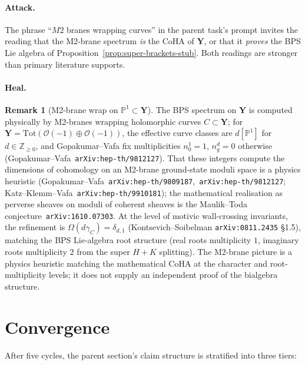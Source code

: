 \documentclass[11pt]{amsart}
\theoremstyle{definition}
\newtheorem{remark}[theorem]{Remark}
\providecommand{\CoHA}{\mathrm{CoHA}}
\providecommand{\bY}{\mathbf{Y}}
\providecommand{\cO}{\mathcal{O}}
\providecommand{\bZ}{\mathbb{Z}}
\providecommand{\bP}{\mathbb{P}}
\begin{document}
\paragraph*{Attack.}
The phrase ``$M$2 branes wrapping curves'' in the parent task's
prompt invites the reading that the M2-brane spectrum \emph{is} the
$\CoHA$ of $\bY$, or that it \emph{proves} the BPS Lie algebra of
Proposition~\ref{prop:super-brackets-stub}. Both readings are
stronger than primary literature supports.

\paragraph*{Heal.}

\begin{remark}[M2-brane wrap on $\bP^1 \subset \bY$]
\label{rem:m2-wrap-status}
The BPS spectrum on $\bY$ is computed physically by M2-branes
wrapping holomorphic curves $C \subset \bY$; for $\bY =
\mathrm{Tot}(\cO(-1) \oplus \cO(-1))$, the effective curve classes
are $d[\bP^1]$ for $d \in \bZ_{\geq 0}$, and Gopakumar--Vafa fix
multiplicities $n_0^1 = 1$, $n_g^d = 0$ otherwise
(Gopakumar--Vafa~\texttt{arXiv:hep-th/9812127}). That these integers
compute the dimensions of cohomology on an M2-brane ground-state
moduli space is a physics heuristic
(Gopakumar--Vafa~\texttt{arXiv:hep-th/9809187},~\texttt{arXiv:hep-th/9812127};
Katz--Klemm--Vafa~\texttt{arXiv:hep-th/9910181}); the mathematical
realisation as perverse sheaves on moduli of coherent sheaves is the
Maulik--Toda conjecture~\texttt{arXiv:1610.07303}. At the level of
motivic wall-crossing invariants, the refinement is
$\Omega(d\gamma_C) = \delta_{d,1}$ (Kontsevich--Soibelman
\texttt{arXiv:0811.2435} \S1.5), matching the BPS Lie-algebra root
structure (real roots multiplicity $1$, imaginary roots multiplicity
$2$ from the super $H+K$ splitting). The M2-brane picture is a
physics heuristic matching the mathematical $\CoHA$ at the character
and root-multiplicity levels; it does not supply an independent
proof of the bialgebra structure.
\end{remark}

\section{Convergence}

After five cycles, the parent section's claim structure is
stratified into three tiers:
\end{document}
